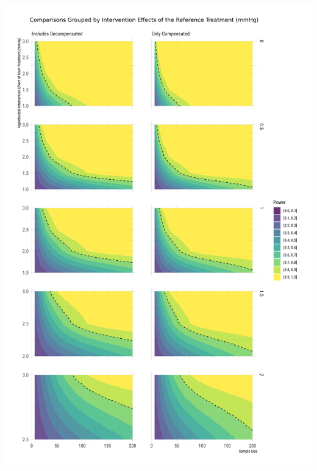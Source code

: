 \documentclass[
]{article}
\begin{document}
\includegraphics{figures/unnamed-chunk-79-1.png}
\end{document}
